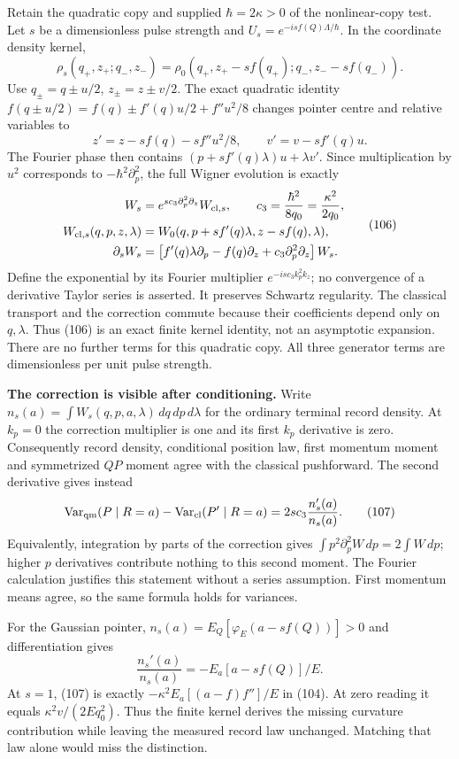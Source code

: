 \documentclass[11pt,a4paper]{article}
\begin{document}
Retain the quadratic copy and supplied \(\hbar=2\kappa>0\) of the
nonlinear-copy test. Let \(s\) be a dimensionless pulse strength and
\(U_s=e^{-isf(Q)\Lambda/\hbar}\). In the coordinate density kernel,
\[\rho_s(q_+,z_+;q_-,z_-)
 =\rho_0(q_+,z_+-sf(q_+);q_-,z_--sf(q_-)).\] Use \(q_\pm=q\pm u/2\),
\(z_\pm=z\pm v/2\). The exact quadratic identity
\(f(q\pm u/2)=f(q)\pm f'(q)u/2+f''u^2/8\) changes pointer centre and
relative variables to \[z'=z-sf(q)-sf''u^2/8,\qquad v'=v-sf'(q)u.\] The
Fourier phase then contains \((p+sf'(q)\lambda)u+\lambda v'\). Since
multiplication by \(u^2\) corresponds to \(-\hbar^2\partial_p^2\), the
full Wigner evolution is exactly \[\begin{aligned}
W_s&=e^{s c_3\partial_p^2\partial_z}W_{{\rm cl},s},\qquad
c_3=\frac{\hbar^2}{8q_0}=\frac{\kappa^2}{2q_0},\\
W_{{\rm cl},s}(q,p,z,\lambda)
 &=W_0(q,p+sf'(q)\lambda,z-sf(q),\lambda),\\
\partial_sW_s
 &=\left[f'(q)\lambda\partial_p-f(q)\partial_z
                  +c_3\partial_p^2\partial_z\right]W_s.
\end{aligned}\tag{106}\] Define the exponential by its Fourier
multiplier \(e^{-is c_3 k_p^2k_z}\); no convergence of a derivative
Taylor series is asserted. It preserves Schwartz regularity. The
classical transport and the correction commute because their
coefficients depend only on \(q,\lambda\). Thus (106) is an exact finite
kernel identity, not an asymptotic expansion. There are no further terms
for this quadratic copy. All three generator terms are dimensionless per
unit pulse strength.

\textbf{The correction is visible after conditioning.} Write
\(n_s(a)=\int W_s(q,p,a,\lambda)\,dq\,dp\,d\lambda\) for the ordinary
terminal record density. At \(k_p=0\) the correction multiplier is one
and its first \(k_p\) derivative is zero. Consequently record density,
conditional position law, first momentum moment and symmetrized \(QP\)
moment agree with the classical pushforward. The second derivative gives
instead \[\operatorname{Var}_{\rm qm}(P\mid R=a)
 -\operatorname{Var}_{\rm cl}(P'\mid R=a)
 =2s c_3\frac{n_s'(a)}{n_s(a)}.\tag{107}\] Equivalently, integration by
parts of the correction gives \(\int p^2\partial_p^2W\,dp=2\int W\,dp\);
higher \(p\) derivatives contribute nothing to this second moment. The
Fourier calculation justifies this statement without a series
assumption. First momentum means agree, so the same formula holds for
variances.

For the Gaussian pointer, \(n_s(a)=E_Q[\varphi_E(a-sf(Q))]>0\) and
differentiation gives \[\frac{n_s'(a)}{n_s(a)}
 =-E_a[a-sf(Q)]/E.\] At \(s=1\), (107) is exactly
\(-\kappa^2E_a[(a-f)f'']/E\) in (104). At zero reading it equals
\(\kappa^2v/(2Eq_0^2)\). Thus the finite kernel derives the missing
curvature contribution while leaving the measured record law unchanged.
Matching that law alone would miss the distinction.
\end{document}

